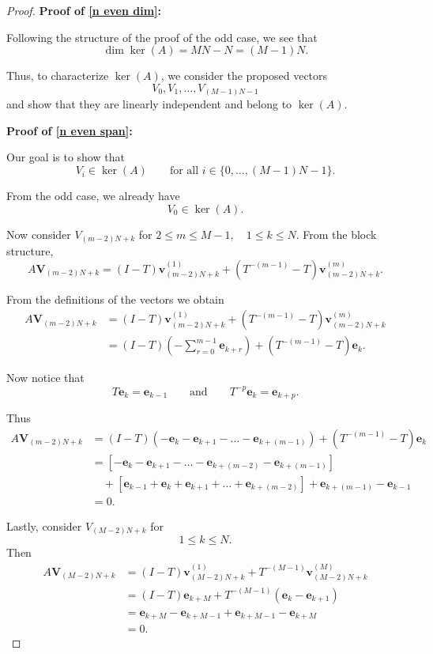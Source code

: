 \documentclass[10pt,a4paper]{amsart}
\begin{document}
\begin{proof}
\noindent\textbf{Proof of \eqref{n even dim}:}

Following the structure of the proof of the odd case, we see that
\[
\dim\ker(A)
=
MN-N
=
(M-1)N.
\]

Thus, to characterize $\ker(A)$, we consider the proposed vectors
\[
V_0,V_1,\dots,V_{(M-1)N-1}
\]
and show that they are linearly independent and belong to $\ker(A)$.

\noindent\textbf{Proof of \eqref{n even span}:}

Our goal is to show that
\[
V_i\in\ker(A)
\qquad
\text{for all }
i\in\{0,\dots,(M-1)N-1\}.
\]

From the odd case, we already have
\[
V_0\in\ker(A).
\]

\noindent Now consider $V_{(m-2)N+k}$ for $2\leq m\leq M-1, \quad 1\leq k\leq N.$
From the block structure,
\[
A\mathbf{V}_{(m-2)N+k}
=
(I-T)\mathbf{v}_{(m-2)N+k}^{(1)}
+
(T^{-(m-1)}-T)\mathbf{v}_{(m-2)N+k}^{(m)}.
\]

From the definitions of the vectors
we obtain
\begin{align*}
A\mathbf{V}_{(m-2)N+k}
&=
(I-T)\mathbf{v}_{(m-2)N+k}^{(1)}
+
(T^{-(m-1)}-T)\mathbf{v}_{(m-2)N+k}^{(m)}\\
&=
(I-T)
\left(-\sum_{r=0}^{m-1} \mathbf{e}_{k+r}
\right)
 +
(T^{-(m-1)}-T)\mathbf{e}_k.
\end{align*}

Now notice that
\[
T\mathbf{e}_k=\mathbf{e}_{k-1}
\qquad\text{and}\qquad
T^{-p}\mathbf{e}_k=\mathbf{e}_{k+p}.
\]

Thus
\begin{align*}
A\mathbf{V}_{(m-2)N+k}
&=
(I-T)
\left(
-\mathbf{e}_k
-\mathbf{e}_{k+1}
-\dots
-\mathbf{e}_{k+(m-1)}
\right)
+
(T^{-(m-1)}-T)\mathbf{e}_k\\
&=
\left[-\mathbf{e}_k
-\mathbf{e}_{k+1}
-\dots
-\mathbf{e}_{k+(m-2)}
-\mathbf{e}_{k+(m-1)}\right]\\
&\quad
+\left[\mathbf{e}_{k-1}
+\mathbf{e}_k
+\mathbf{e}_{k+1}
+\dots
+\mathbf{e}_{k+(m-2)}\right]
+\mathbf{e}_{k+(m-1)}
-\mathbf{e}_{k-1}\\
&=
0.
\end{align*}

Lastly, consider $V_{(M-2)N+k}$ for
\[
1\leq k\leq N.
\]
Then
\begin{align*}
A\mathbf{V}_{(M-2)N+k}
&=
(I-T)\mathbf{v}_{(M-2)N+k}^{(1)}
+
T^{-(M-1)}
\mathbf{v}_{(M-2)N+k}^{(M)}\\
&=
(I-T)\mathbf{e}_{k+M}
+
T^{-(M-1)}
(\mathbf{e}_k-\mathbf{e}_{k+1})\\
&=
\mathbf{e}_{k+M}
-
\mathbf{e}_{k+M-1}
+
\mathbf{e}_{k+M-1}
-
\mathbf{e}_{k+M}\\
&=
0.
\end{align*}


\end{proof}
\end{document}
